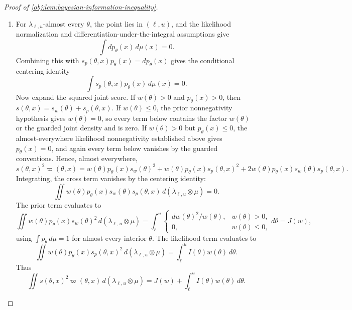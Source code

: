 \begin{proof}[Proof of \cref{obj:lem:bayesian-information-inequality}]
\begin{enumerate}
\item For \(\lambda_{\ell,u}\)-almost every \(\theta\), the point lies in \((\ell,u)\), and
the likelihood normalization and differentiation-under-the-integral assumptions give
\[
\int dp_\theta(x)\,d\mu(x)=0.
\]
Combining this with \(s_p(\theta,x)p_\theta(x)=dp_\theta(x)\) gives the conditional
centering identity
\[
\int s_p(\theta,x)p_\theta(x)\,d\mu(x)=0.
\]
Now expand the squared joint score.  If \(w(\theta)>0\) and \(p_\theta(x)>0\), then
\(s(\theta,x)=s_w(\theta)+s_p(\theta,x)\).  If \(w(\theta)\le0\), the prior
nonnegativity hypothesis gives \(w(\theta)=0\), so every term below contains the factor
\(w(\theta)\) or the guarded joint density and is zero.  If \(w(\theta)>0\) but
\(p_\theta(x)\le0\), the almost-everywhere likelihood nonnegativity established above
gives \(p_\theta(x)=0\), and again every term below vanishes by the guarded conventions.
Hence, almost everywhere,
\[
s(\theta,x)^2\varpi(\theta,x)
 =
w(\theta)p_\theta(x)s_w(\theta)^2
 +
w(\theta)p_\theta(x)s_p(\theta,x)^2
 +
2w(\theta)p_\theta(x)s_w(\theta)s_p(\theta,x).
\]
Integrating, the cross term vanishes by the centering identity:
\[
\iint w(\theta)p_\theta(x)s_w(\theta)s_p(\theta,x)\,
d(\lambda_{\ell,u}\otimes\mu)=0.
\]
The prior term evaluates to
\[
\iint w(\theta)p_\theta(x)s_w(\theta)^2\,d(\lambda_{\ell,u}\otimes\mu)
 =
\int_\ell^u
\begin{cases}
dw(\theta)^2/w(\theta),& w(\theta)>0,\\
0,& w(\theta)\le0,
\end{cases}
d\theta
 =
J(w),
\]
using \(\int p_\theta\,d\mu=1\) for almost every interior \(\theta\).  The likelihood
term evaluates to
\[
\iint w(\theta)p_\theta(x)s_p(\theta,x)^2\,d(\lambda_{\ell,u}\otimes\mu)
 =
\int_\ell^u I(\theta)w(\theta)\,d\theta.
\]
Thus
\[
\iint s(\theta,x)^2\varpi(\theta,x)\,d(\lambda_{\ell,u}\otimes\mu)
 =
J(w)+\int_\ell^u I(\theta)w(\theta)\,d\theta.
\] %


\end{enumerate}
\end{proof}
